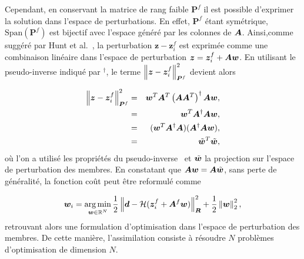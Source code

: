 Cependant, en conservant la matrice de rang faible $\bm P^f$ il est possible d'exprimer la solution dans l'espace de perturbations. En effet, $\bm P^f$ étant symétrique, $\text{Span}(\bm P^f)$ est bijectif avec l'espace généré par les colonnes de $\bm A$.
Ainsi,comme suggéré par Hunt et al.~\cite{Hunt2007}, la perturbation $\bm z -\bm z^f_i$ est exprimée comme une combinaison linéaire dans l'espace de perturbation $\bm z = \bm z^f_i + \bm A \bm w$. En utilisant le pseudo-inverse indiqué par $^\dagger$, le terme $\left\lVert \bm z -\bm z^f_i \right\rVert^2_{\bm P^f}$ devient alors

\begin{eqnarray*}
    \left\lVert \bm z -\bm z^f_i \right\rVert^2_{\bm P^f} &=&  \bm w^T \bm A^T\left(\bm A \bm A^T\right)^\dagger \bm A \bm w,\\
    &=&\bm w^T \bm A^\dagger  \bm A \bm w,\\
    &=&(\bm w^T \bm A^\dagger  \bm A) (\bm A^\dagger  \bm A \bm w), \\
    &=& \tilde{\bm w}^T \tilde{\bm w},
\end{eqnarray*}où l'on a utilisé les propriétés du pseudo-inverse~\cite{ben-israel2003generalized} et $\tilde{\bm w}$ la projection sur l'espace de perturbation des membres. En constatant que $\bm A \bm w =\bm A \tilde{\bm w}$, sans perte de généralité, la fonction coût peut être reformulé comme

\begin{equation*}
    \bm w_i = \operatorname*{arg\,min}_{\bm w \in \mathbb R^N} \frac12 \left\lVert \bm d - \mathcal H(\bm{z}_i^f + \bm A^f \bm w) \right\rVert^2_{\bm R} + \frac12 \left\lVert \bm w \right\rVert_2^2,
\end{equation*}retrouvant alors une formulation d'optimisation dans l'espace de perturbation des membres. De cette manière, l'assimilation consiste à résoudre $N$ problèmes d'optimisation de dimension $N$.




